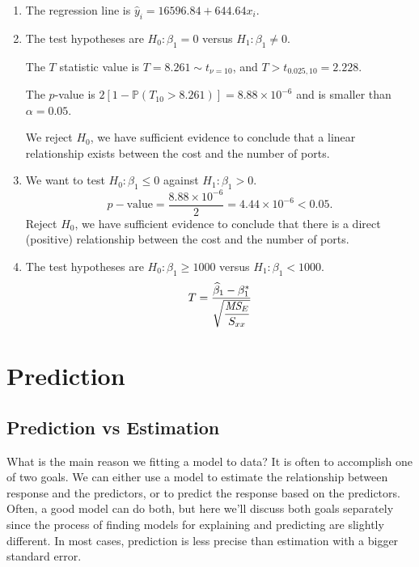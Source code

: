 \begin{solution}
    \begin{enumerate}
        From the outputs provided above:

        \item The regression line is $\widehat{y}_i = 16596.84 + 644.64x_i$.
        \item The test hypotheses are $H_0: \beta_1 = 0$ versus $H_1 : \beta_1 \neq 0$.
        
        The $T$ statistic value is $T = 8.261 \sim t_{\nu = 10}$, and $T > t_{0.025, 10} = 2.228$.

        The $p$-value is $2[1 - \mathbb{P}(T_{10} > 8.261)] = 8.88 \times 10^{-6}$ and is smaller than $\alpha = 0.05$.

        We reject $H_0$, we have sufficient evidence to conclude that a linear relationship exists between the cost and 
        the number of ports.

        \item We want to test $H_0 : \beta_1 \leq 0$ against $H_1 : \beta_1 > 0$.
        \[
            p-\text{value} = \frac{8.88 \times 10^{-6}}{2} = 4.44 \times 10^{-6} < 0.05.
        \]
        Reject $H_0$, we have sufficient evidence to conclude that there is a direct (positive) relationship 
        between the cost and the number of ports.

        \item The test hypotheses are $H_0: \beta_1 \geq 1000$ versus $H_1 : \beta_1 < 1000$.
        \[
            T = \frac{\widehat{\beta}_1 - \beta^*_1}{\sqrt{\displaystyle \frac{\textit{MS}_{E}}{S_{xx}}}}
        \]
    \end{enumerate}
\end{solution}

\section{Prediction}

\subsection{Prediction vs Estimation}

What is the main reason we fitting a model to data? It is often to accomplish one of two goals. We can either
use a model to estimate the relationship between response and the predictors, or to predict the response
based on the predictors. Often, a good model can do both, but here we'll discuss both goals separately since
the process of finding models for explaining and predicting are slightly different. In most cases, prediction
is less precise than estimation with a bigger standard error.

